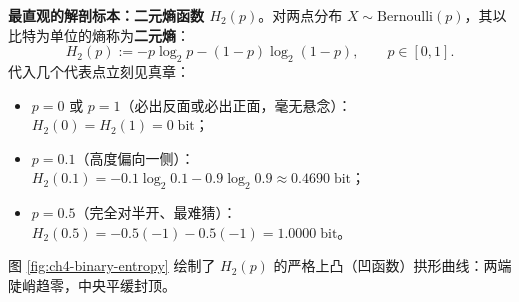 \textbf{最直观的解剖标本：二元熵函数 $H_2(p)$}。对两点分布 $X \sim \mathrm{Bernoulli}(p)$，其以比特为单位的熵称为\textbf{二元熵}：
\[
  H_2(p) := -p\log_2 p - (1-p)\log_2(1-p), \qquad p \in [0, 1].
\]
代入几个代表点立刻见真章：
\begin{itemize}
  \item $p = 0$ 或 $p = 1$（必出反面或必出正面，毫无悬念）：$H_2(0) = H_2(1) = 0\;\text{bit}$；
  \item $p = 0.1$（高度偏向一侧）：$H_2(0.1) = -0.1\log_2 0.1 - 0.9\log_2 0.9 \approx 0.4690\;\text{bit}$；
  \item $p = 0.5$（完全对半开、最难猜）：$H_2(0.5) = -0.5(-1) - 0.5(-1) = 1.0000\;\text{bit}$。
\end{itemize}
图 \ref{fig:ch4-binary-entropy} 绘制了 $H_2(p)$ 的严格上凸（凹函数）拱形曲线：两端陡峭趋零，中央平缓封顶。

